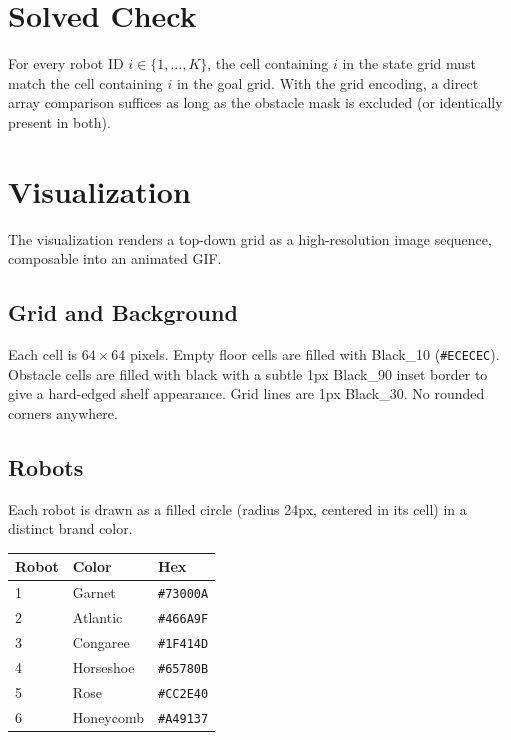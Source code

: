 \documentclass[11pt]{article}
\begin{document}
\section{Solved Check}

For every robot ID $i \in \{1, \ldots, K\}$, the cell containing $i$ in the state grid must match the cell containing $i$ in the goal grid. With the grid encoding, a direct array comparison suffices as long as the obstacle mask is excluded (or identically present in both).

\section{Visualization}

The visualization renders a top-down grid as a high-resolution image sequence, composable into an animated GIF.

\subsection{Grid and Background}

Each cell is $64 \times 64$ pixels. Empty floor cells are filled with \textcolor{Black10}{Black\_10} (\texttt{\#ECECEC}). Obstacle cells are filled with black with a subtle 1px \textcolor{Black90}{Black\_90} inset border to give a hard-edged shelf appearance. Grid lines are 1px \textcolor{Black30}{Black\_30}. No rounded corners anywhere.

\subsection{Robots}

Each robot is drawn as a filled circle (radius 24px, centered in its cell) in a distinct brand color.

\begin{table}[h]
\centering
\begin{tabular}{lll}
\toprule
Robot & Color & Hex \\
\midrule
1 & \textcolor{Garnet}{Garnet} & \texttt{\#73000A} \\
2 & \textcolor{Atlantic}{Atlantic} & \texttt{\#466A9F} \\
3 & \textcolor{Congaree}{Congaree} & \texttt{\#1F414D} \\
4 & \textcolor{Horseshoe}{Horseshoe} & \texttt{\#65780B} \\
5 & \textcolor{Rose}{Rose} & \texttt{\#CC2E40} \\
6 & \textcolor{Honeycomb}{Honeycomb} & \texttt{\#A49137} \\
\bottomrule
\end{tabular}
\end{table}
\end{document}
